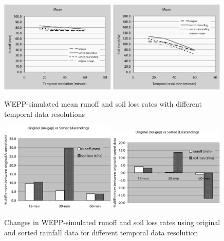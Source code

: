 \begin{figure}[htbp]
  \centering
    \includegraphics[width=0.49\textwidth]{./img/wepp_mean_runoff}
    \includegraphics[width=0.49\textwidth]{./img/wepp_mean_soilloss}
  \caption{WEPP-simulated mean runoff and soil loss rates with different
temporal data resolutions}
  \label{fig:wepp_mean_runoff_soilloss_diff}
\end{figure}

\begin{figure}[htbp]
  \centering
    \includegraphics[width=0.49\textwidth]{./img/wepp_diff_runoff_soilloss_asc}
    \includegraphics[width=0.49\textwidth]{./img/wepp_diff_runoff_soilloss_des}
  \caption{Changes in WEPP-simulated runoff and soil loss rates using original
and sorted rainfall data for different temporal data resolution}
  \label{fig:wepp_diff_runoff_soilloss}
\end{figure}

